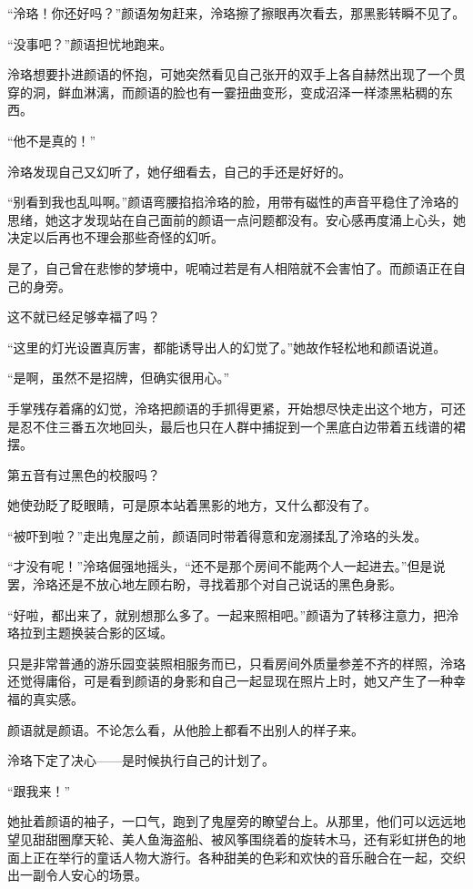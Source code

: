 \documentclass[UTF8, scheme = chinese, openany]{ctexbook}
\begin{document}
“泠珞！你还好吗？”颜语匆匆赶来，泠珞擦了擦眼再次看去，那黑影转瞬不见了。

“没事吧？”颜语担忧地跑来。

泠珞想要扑进颜语的怀抱，可她突然看见自己张开的双手上各自赫然出现了一个贯穿的洞，鲜血淋漓，而颜语的脸也有一霎扭曲变形，变成沼泽一样漆黑粘稠的东西。

“他不是真的！”

泠珞发现自己又幻听了，她仔细看去，自己的手还是好好的。

“别看到我也乱叫啊。”颜语弯腰掐掐泠珞的脸，用带有磁性的声音平稳住了泠珞的思绪，她这才发现站在自己面前的颜语一点问题都没有。安心感再度涌上心头，她决定以后再也不理会那些奇怪的幻听。

是了，自己曾在悲惨的梦境中，呢喃过若是有人相陪就不会害怕了。而颜语正在自己的身旁。

这不就已经足够幸福了吗？

“这里的灯光设置真厉害，都能诱导出人的幻觉了。”她故作轻松地和颜语说道。

“是啊，虽然不是招牌，但确实很用心。”

手掌残存着痛的幻觉，泠珞把颜语的手抓得更紧，开始想尽快走出这个地方，可还是忍不住三番五次地回头，最后也只在人群中捕捉到一个黑底白边带着五线谱的裙摆。

第五音有过黑色的校服吗？

她使劲眨了眨眼睛，可是原本站着黑影的地方，又什么都没有了。

“被吓到啦？”走出鬼屋之前，颜语同时带着得意和宠溺揉乱了泠珞的头发。

“才没有呢！”泠珞倔强地摇头，“还不是那个房间不能两个人一起进去。”但是说罢，泠珞还是不放心地左顾右盼，寻找着那个对自己说话的黑色身影。

“好啦，都出来了，就别想那么多了。一起来照相吧。”颜语为了转移注意力，把泠珞拉到主题换装合影的区域。

只是非常普通的游乐园变装照相服务而已，只看房间外质量参差不齐的样照，泠珞还觉得庸俗，可是看到颜语的身影和自己一起显现在照片上时，她又产生了一种幸福的真实感。

颜语就是颜语。不论怎么看，从他脸上都看不出别人的样子来。

泠珞下定了决心——是时候执行自己的计划了。

“跟我来！”

她扯着颜语的袖子，一口气，跑到了鬼屋旁的瞭望台上。从那里，他们可以远远地望见甜甜圈摩天轮、美人鱼海盗船、被风筝围绕着的旋转木马，还有彩虹拼色的地面上正在举行的童话人物大游行。各种甜美的色彩和欢快的音乐融合在一起，交织出一副令人安心的场景。
\end{document}
